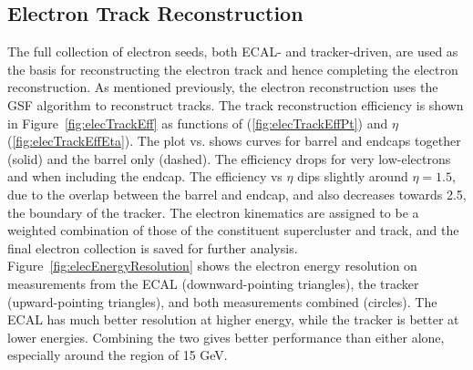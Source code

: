 \subsection{Electron Track Reconstruction}
\label{evReco:elecTrk}

The full collection of electron seeds, 
both ECAL- and tracker-driven, 
are used as the basis for reconstructing 
the electron track and hence 
completing the electron reconstruction.  
As mentioned previously, 
the electron reconstruction uses the 
GSF algorithm to reconstruct tracks.  
The track reconstruction efficiency is shown 
in Figure~\ref{fig:elecTrackEff} 
as functions of \pt (\ref{fig:elecTrackEffPt}) 
and $\eta$ (\ref{fig:elecTrackEffEta}). 
The plot vs. \pt shows curves for 
barrel and endcaps together (solid) 
and the barrel only (dashed).  
The efficiency drops for very low-\pt electrons 
and when including the endcap. 
The efficiency vs $\eta$ dips slightly 
around $\eta = 1.5$, 
due to the overlap between the barrel and endcap, 
and also decreases towards 2.5, 
the boundary of the tracker.  
The electron kinematics are 
assigned to be a weighted combination 
of those of the constituent supercluster 
and track, 
and the final electron collection 
is saved for further analysis.  
Figure~\ref{fig:elecEnergyResolution} 
shows the electron energy resolution 
on measurements from the ECAL (downward-pointing triangles), 
the tracker (upward-pointing triangles), 
and both measurements combined (circles).  
The ECAL has much better resolution at higher energy, 
while the tracker is better at lower energies.  
Combining the two gives better performance than 
either alone, especially around the region of 15 GeV.  

